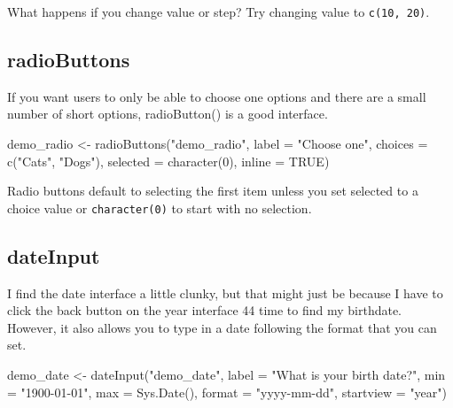 \documentclass[
]{book}
\newenvironment{Shaded}{\begin{snugshade}}{\end{snugshade}}
\newcommand{\AttributeTok}[1]{\textcolor[rgb]{0.77,0.63,0.00}{#1}}
\newcommand{\ConstantTok}[1]{\textcolor[rgb]{0.00,0.00,0.00}{#1}}
\newcommand{\DecValTok}[1]{\textcolor[rgb]{0.00,0.00,0.81}{#1}}
\newcommand{\FunctionTok}[1]{\textcolor[rgb]{0.00,0.00,0.00}{#1}}
\newcommand{\NormalTok}[1]{#1}
\newcommand{\OtherTok}[1]{\textcolor[rgb]{0.56,0.35,0.01}{#1}}
\newcommand{\StringTok}[1]{\textcolor[rgb]{0.31,0.60,0.02}{#1}}
\begin{document}
What happens if you change value or step? Try changing value to \texttt{c(10,\ 20)}.

\hypertarget{radiobuttons}{%
\subsection{radioButtons}\label{radiobuttons}}

If you want users to only be able to choose one options and there are a small number of short options, radioButton() is a good interface.

\begin{Shaded}
\begin{Highlighting}[]
\NormalTok{demo\_radio }\OtherTok{\textless{}{-}} \FunctionTok{radioButtons}\NormalTok{(}\StringTok{"demo\_radio"}\NormalTok{,}
                           \AttributeTok{label =} \StringTok{"Choose one"}\NormalTok{,}
                           \AttributeTok{choices =} \FunctionTok{c}\NormalTok{(}\StringTok{"Cats"}\NormalTok{, }\StringTok{"Dogs"}\NormalTok{),}
                           \AttributeTok{selected =} \FunctionTok{character}\NormalTok{(}\DecValTok{0}\NormalTok{),}
                           \AttributeTok{inline =} \ConstantTok{TRUE}\NormalTok{)}
\end{Highlighting}
\end{Shaded}

Radio buttons default to selecting the first item unless you set selected to a choice value or \texttt{character(0)} to start with no selection.

\hypertarget{dateinput}{%
\subsection{dateInput}\label{dateinput}}

I find the date interface a little clunky, but that might just be because I have to click the back button on the year interface 44 time to find my birthdate. However, it also allows you to type in a date following the format that you can set.

\begin{Shaded}
\begin{Highlighting}[]
\NormalTok{demo\_date }\OtherTok{\textless{}{-}} \FunctionTok{dateInput}\NormalTok{(}\StringTok{"demo\_date"}\NormalTok{,}
                       \AttributeTok{label =} \StringTok{"What is your birth date?"}\NormalTok{,}
                       \AttributeTok{min =} \StringTok{"1900{-}01{-}01"}\NormalTok{,}
                       \AttributeTok{max =} \FunctionTok{Sys.Date}\NormalTok{(),}
                       \AttributeTok{format =} \StringTok{"yyyy{-}mm{-}dd"}\NormalTok{,}
                       \AttributeTok{startview =} \StringTok{"year"}\NormalTok{)}
\end{Highlighting}
\end{Shaded}
\end{document}
